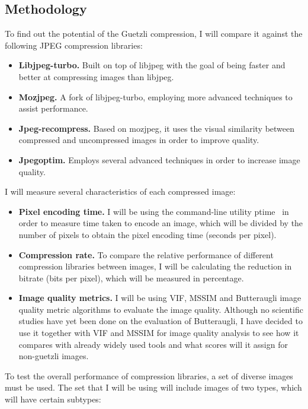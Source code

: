 \documentclass[12pt]{article}
\begin{document}
\subsection{Methodology}
To find out the potential of the Guetzli compression, I will compare it against the following JPEG compression libraries:
\begin{itemize}
	\item \textbf{Libjpeg-turbo.} Built on top of libjpeg with the goal of being faster and better at compressing images than libjpeg.
	\item \textbf{Mozjpeg.} A fork of libjpeg-turbo, employing more advanced techniques to assist performance.
	\item \textbf{Jpeg-recompress.} Based on mozjpeg, it uses the visual similarity between compressed and uncompressed images in order to improve quality.
	\item \textbf{Jpegoptim.} Employs several advanced techniques in order to increase image quality.
\end{itemize}
I will measure several characteristics of each compressed image:
\begin{itemize}
	\item \textbf{Pixel encoding time.} I will be using the command-line utility ptime~\cite{ptime} in order to measure time taken to encode an image, which will be divided by the number of pixels to obtain the pixel encoding time (seconds per pixel).
	\item \textbf{Compression rate.} To compare the relative performance of different compression libraries between images, I will be calculating the reduction in bitrate (bits per pixel), which will be measured in percentage.
	\item \textbf{Image quality metrics.} I will be using VIF, MSSIM and Butteraugli image quality metric algorithms to evaluate the image quality. Although no scientific studies have yet been done on the evaluation of Butteraugli, I have decided to use it together with VIF and MSSIM for image quality analysis to see how it compares with already widely used tools and what scores will it assign for non-guetzli images.
\end{itemize}
To test the overall performance of compression libraries, a set of diverse images must be used. The set that I will be using will include images of two types, which will have certain subtypes:
\end{document}
